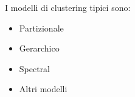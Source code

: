 	I modelli di clustering tipici sono:
	\begin{itemize}
		\item Partizionale
		\item Gerarchico
		\item Spectral
		\item Altri modelli
	\end{itemize}

	
	
	
	
%	
%	
